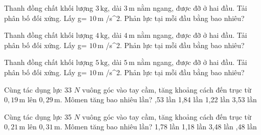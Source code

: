 \begin{bt}
Thanh đồng chất khối lượng $3\,\text{kg}$, dài $3\,\text{m}$ nằm ngang, được đỡ ở hai đầu. Tải phân bố đối xứng. Lấy g= $10\,\text{m}$ /s^2. Phản lực tại mỗi đầu bằng bao nhiêu?
\end{bt}

\begin{bt}
Thanh đồng chất khối lượng $4\,\text{kg}$, dài $4\,\text{m}$ nằm ngang, được đỡ ở hai đầu. Tải phân bố đối xứng. Lấy g= $10\,\text{m}$ /s^2. Phản lực tại mỗi đầu bằng bao nhiêu?
\end{bt}

\begin{bt}
Thanh đồng chất khối lượng $5\,\text{kg}$, dài $5\,\text{m}$ nằm ngang, được đỡ ở hai đầu. Tải phân bố đối xứng. Lấy g= $10\,\text{m}$ /s^2. Phản lực tại mỗi đầu bằng bao nhiêu?
\end{bt}

\begin{ex}
Cùng tác dụng lực 33 $N$ vuông góc vào tay cầm, tăng khoảng cách đến trục từ $0,19\,\text{m}$ lên $0,29\,\text{m}$. Mômen tăng bao nhiêu lần?
\choice
{,53 lần}
{1,84 lần}
{1,22 lần}
{3,53 lần}
\end{ex}

\begin{ex}
Cùng tác dụng lực 35 $N$ vuông góc vào tay cầm, tăng khoảng cách đến trục từ $0,21\,\text{m}$ lên $0,31\,\text{m}$. Mômen tăng bao nhiêu lần?
\choice
{1,78 lần}
{1,18 lần}
{3,48 lần}
{,48 lần}
\end{ex}

